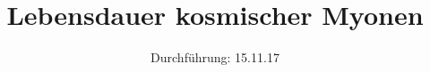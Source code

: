 

\subject{V01 }
\title{Lebensdauer kosmischer Myonen}
\date{
  Durchführung: 15.11.17 
}



\maketitle
\thispagestyle{empty}
\tableofcontents
\newpage
\setcounter{page}{1}





\printbibliography


